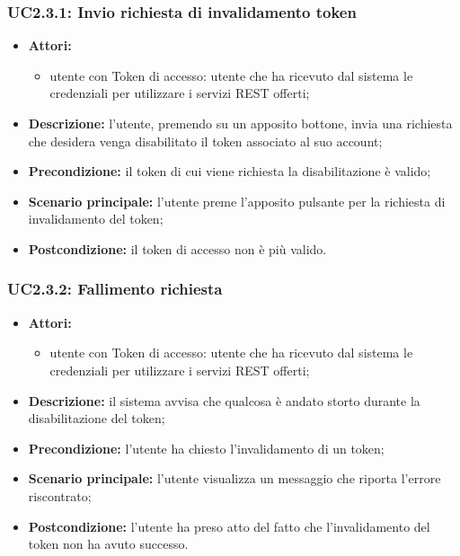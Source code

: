 \subsubsection{UC2.3.1: Invio richiesta di invalidamento token}

\begin{itemize}
	\item \textbf{Attori:}
	\begin{itemize}
		\item utente con Token di accesso: utente che ha ricevuto dal sistema le credenziali per utilizzare i servizi REST offerti;
	\end{itemize}
	\item \textbf{Descrizione:} l'utente, premendo su un apposito bottone, invia una richiesta che desidera venga disabilitato il token associato al suo account;
	\item \textbf{Precondizione:} il token di cui viene richiesta la disabilitazione è valido;
	\item \textbf{Scenario principale:} l'utente preme l'apposito pulsante per la richiesta di invalidamento del token;
	\item \textbf{Postcondizione:} il token di accesso non è più valido.
\end{itemize}

\subsubsection{UC2.3.2: Fallimento richiesta}
\begin{itemize}
	\item \textbf{Attori:}
	\begin{itemize}
		\item utente con Token di accesso: utente che ha ricevuto dal sistema le credenziali per utilizzare i servizi REST offerti;
	\end{itemize}
	\item \textbf{Descrizione:} il sistema avvisa che qualcosa è andato storto durante la disabilitazione del token;
	\item \textbf{Precondizione:} l'utente ha chiesto l'invalidamento di un token;
	\item \textbf{Scenario principale:} l'utente visualizza un messaggio che riporta l'errore riscontrato;
	\item \textbf{Postcondizione:} l'utente ha preso atto del fatto che l'invalidamento del token non ha avuto successo.
\end{itemize}


